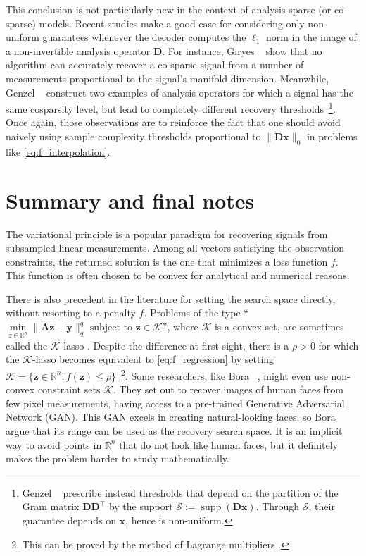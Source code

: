 This conclusion is not particularly new in the context of analysis-sparse (or co-sparse) models. Recent studies make a good case for considering only non-uniform guarantees whenever the decoder computes the $\ell_1$ norm in the image of a non-invertible analysis operator $\mathbf{D}$. For instance, Giryes \etal~\cite{giryes2015, giryes2015a} show that no algorithm can accurately recover a co-sparse signal from a number of measurements proportional to the signal's manifold dimension. Meanwhile, Genzel \etal~\cite{genzel2017a} construct two examples of analysis operators for which a signal has the same cosparsity level, but lead to completely different recovery thresholds~\footnote{Genzel \etal~\cite{genzel2017a} prescribe instead thresholds that depend on the partition of the Gram matrix $\mathbf{D} \mathbf{D}^\top$ by the support $\mathcal{S} := \operatorname{supp}\left ( \mathbf{Dx} \right )$. Through $\mathcal{S}$, their guarantee depends on $\mathbf{x}$, hence is non-uniform.}. Once again, those observations are to reinforce the fact that one should avoid naively using sample complexity thresholds proportional to $\|\mathbf{Dx}\|_0$ in problems like \eqref{eq:f_interpolation}.


\section{Summary and final notes}

The variational principle is a popular paradigm for recovering signals from subsampled linear measurements. Among all vectors satisfying the observation constraints, the returned solution is the one that minimizes a loss function $f$. This function is often chosen to be convex for analytical and numerical reasons.

There is also precedent in the literature for setting the search space directly, without resorting to a penalty $f$. Problems of the type ``$\underset{z \in \mathbb{R}^{n}}{\min} \| \mathbf{Az - y} \|_q^q \text{ subject to } \mathbf{z} \in \mathcal{K}$'', where $\mathcal{K}$ is a convex set, are sometimes called the $\mathcal{K}$-lasso \cite{plan2016}. Despite the difference at first sight, there is a $\rho > 0$ for which the $\mathcal{K}$-lasso becomes equivalent to \eqref{eq:f_regression} by setting $\mathcal{K} = \{\mathbf{z} \in \mathbb{R}^{n}: f(\mathbf{z}) \leq \rho \}$~\footnote{This can be proved by the method of Lagrange multipliers \cite[Chapter 5]{boyd2009}.}. Some researchers, like Bora \etal~\cite{bora2017a}, might even use non-convex constraint sets $\mathcal{K}$. They set out to recover images of human faces from few pixel measurements, having access to a pre-trained Generative Adversarial Network (GAN). This GAN excels in creating natural-looking faces, so Bora \etal argue that its range can be used as the recovery search space. It is an implicit way to avoid points in $\mathbb{R}^{n}$ that do not look like human faces, but it definitely makes the problem harder to study mathematically.

